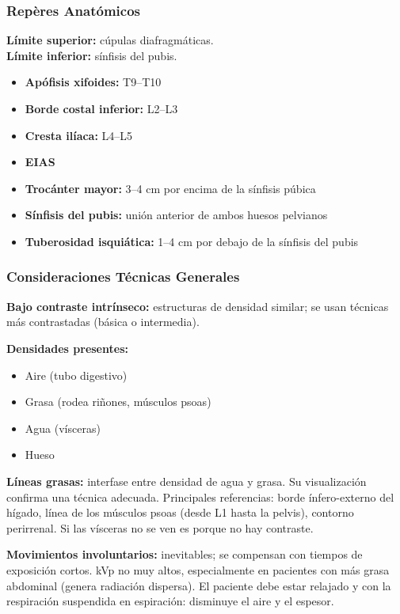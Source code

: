 	\subsubsection*{Repères Anatómicos}
	
	\textbf{Límite superior:} cúpulas diafragmáticas. \\
	\textbf{Límite inferior:} sínfisis del pubis.
	
	\begin{itemize}
		\item \textbf{Apófisis xifoides:} T9--T10
		\item \textbf{Borde costal inferior:} L2--L3
		\item \textbf{Cresta ilíaca:} L4--L5
		\item \textbf{EIAS}
		\item \textbf{Trocánter mayor:} 3--4 cm por encima de la sínfisis púbica
		\item \textbf{Sínfisis del pubis:} unión anterior de ambos huesos pelvianos
		\item \textbf{Tuberosidad isquiática:} 1--4 cm por debajo de la sínfisis del pubis
	\end{itemize}
	
	\subsubsection*{Consideraciones Técnicas Generales}
	
	\textbf{Bajo contraste intrínseco:} estructuras de densidad similar; se usan técnicas más contrastadas (básica o intermedia).
	
	\textbf{Densidades presentes:}
	\begin{itemize}
		\item Aire (tubo digestivo)
		\item Grasa (rodea riñones, músculos psoas)
		\item Agua (vísceras)
		\item Hueso
	\end{itemize}
	
	\textbf{Líneas grasas:} interfase entre densidad de agua y grasa. Su visualización confirma una técnica adecuada. Principales referencias: borde ínfero-externo del hígado, línea de los músculos psoas (desde L1 hasta la pelvis), contorno perirrenal. Si las vísceras no se ven es porque no hay contraste.
	
	\textbf{Movimientos involuntarios:} inevitables; se compensan con tiempos de exposición cortos. kVp no muy altos, especialmente en pacientes con más grasa abdominal (genera radiación dispersa). El paciente debe estar relajado y con la respiración suspendida en espiración: disminuye el aire y el espesor.
	
